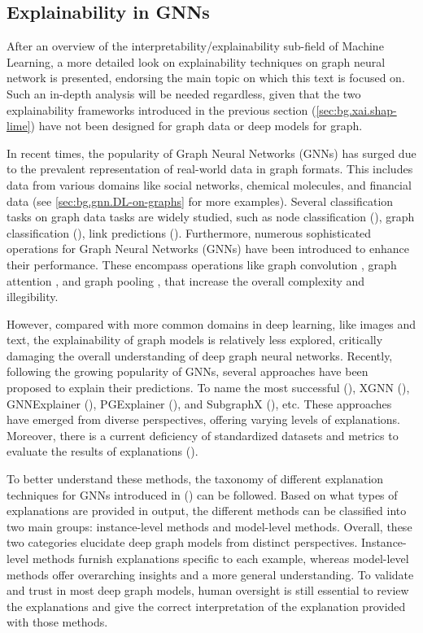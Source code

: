 \documentclass[binding=0.6cm]{sapthesis}
\newcommand{\mycite}[1]{(\cite{#1})}
\begin{document}
\subsection{Explainability in GNNs}
\label{sec:bg.xai.gnn-xai}
After an overview of the interpretability/explainability sub-field of Machine Learning, a more detailed look on explainability techniques on graph neural network is presented, endorsing the main topic on which this text is focused on. Such an in-depth analysis will be needed regardless, given that the two explainability frameworks introduced in the previous section (\cref{sec:bg.xai.shap-lime}) have not been designed for graph data or deep models for graph.  

In recent times, the popularity of Graph Neural Networks (GNNs) has surged due to the prevalent representation of real-world data in graph formats. This includes data from various domains like social networks, chemical molecules, and financial data (see \cref{sec:bg.gnn.DL-on-graphs} for more examples). Several classification tasks on graph data tasks are widely studied, such as node classification \mycite{gao2019-graph-unets,henaff2015-deep-on-graph}, graph classification \mycite{xu2019-powerful,Zhang_Cui_Neumann_Chen_2018}, link predictions \mycite{zhang2018-link,cai2020-multi-scale}. Furthermore, numerous sophisticated operations for Graph Neural Networks (GNNs) have been introduced to enhance their performance. These encompass operations like graph convolution \cite{kipf2016-semisupervised}, graph attention \cite{veličković2018gat}, and graph pooling \cite{yuan2020-struct-pool}, that increase the overall complexity and illegibility.

However, compared with more common domains in deep learning, like images and text, the explainability of graph models is relatively less explored, critically damaging the overall understanding of deep graph neural networks. Recently, following the growing popularity of GNNs, several approaches have been proposed to explain their predictions. To name the most successful \mycite{xie2022-taskagnostic}, XGNN \mycite{yuan2020-xgnn}, GNNExplainer \mycite{ying2019-gnnexplainer}, PGExplainer \mycite{luo2020-pgexplainer}, and SubgraphX \mycite{yuan2021-subgraphx}, etc. These approaches have emerged from diverse perspectives, offering varying levels of explanations. Moreover, there is a current deficiency of standardized datasets and metrics to evaluate the results of explanations \mycite{yuan2022-xai-gnn-survey}.

To better understand these methods, the taxonomy of different explanation techniques for GNNs introduced in \mycite{yuan2022-xai-gnn-survey} can be followed. Based on what types of explanations are provided in output, the different methods can be classified into two main groups: instance-level methods and model-level methods. Overall, these two categories elucidate deep graph models from distinct perspectives. Instance-level methods furnish explanations specific to each example, whereas model-level methods offer overarching insights and a more general understanding. To validate and trust in most deep graph models, human oversight is still essential to review the explanations and give the correct interpretation of the explanation provided with those methods.
\end{document}
